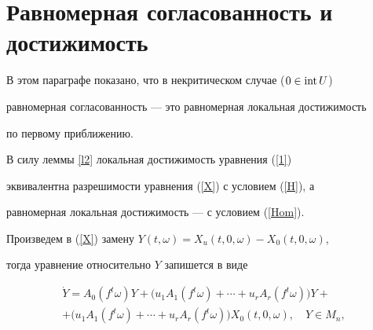 




\section{Равномерная согласованность и достижимость}





В этом параграфе показано, что в некритическом случае ($0\in\operatorname{int} U$)


равномерная согласованность --- это равномерная локальная достижимость


по первому приближению.





В силу леммы \ref{l2} локальная достижимость уравнения (\ref{1})


эквивалентна разрешимости уравнения (\ref{X}) с условием (\ref{H}), а


равномерная локальная достижимость --- с условием (\ref{Hom}).


Произведем в (\ref{X}) замену $Y(t,\omega)=X_u(t,0,\omega)-X_0(t,0,\omega)$,


тогда уравнение относительно $Y$ запишется в виде


\begin{multline}


\label{Y}


\Dot Y=A_0(f^t\omega)Y+\Big(u_1A_1(f^t\omega)+\dotsb


+u_rA_r(f^t\omega)\Big)Y+\\


+\Big(u_1A_1(f^t\omega)+\dotsb+u_rA_r(f^t\omega)\Big)


X_0(t,0,\omega),\quad Y\in M_n,


\end{multline}


